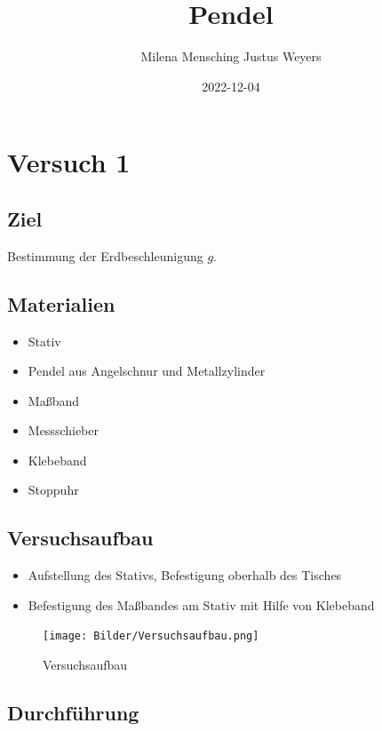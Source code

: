 \documentclass[
  9pt,
]{article}
\title{Pendel}
\author{Milena Mensching Justus Weyers}
\date{2022-12-04}
\providecommand{\tightlist}{%
  \setlength{\itemsep}{0pt}\setlength{\parskip}{0pt}}
\begin{document}
\maketitle

\hypertarget{versuch-1}{%
\section{Versuch 1}\label{versuch-1}}

\hypertarget{ziel}{%
\subsection{Ziel}\label{ziel}}

Bestimmung der Erdbeschleunigung \(g\).

\hypertarget{materialien}{%
\subsection{Materialien}\label{materialien}}

\begin{itemize}
\tightlist
\item
  Stativ
\item
  Pendel aus Angelschnur und Metallzylinder
\item
  Maßband
\item
  Messschieber
\item
  Klebeband
\item
  Stoppuhr
\end{itemize}

\hypertarget{versuchsaufbau}{%
\subsection{Versuchsaufbau}\label{versuchsaufbau}}

\begin{itemize}
\tightlist
\item
  Aufstellung des Stativs, Befestigung oberhalb des Tisches
\item
  Befestigung des Maßbandes am Stativ mit Hilfe von Klebeband
\end{itemize}

\begin{figure}
\centering
\texttt{[image: Bilder/Versuchsaufbau.png]}
\caption{Versuchsaufbau}
\end{figure}

\hypertarget{durchfuxfchrung}{%
\subsection{Durchführung}\label{durchfuxfchrung}}
\end{document}
